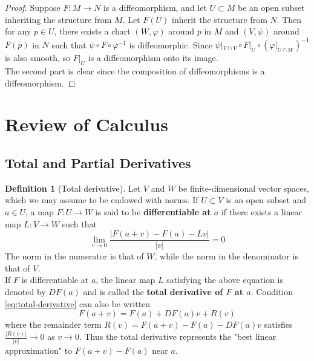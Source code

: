 \documentclass[reqno]{amsart}
\theoremstyle{plain}%
\theoremstyle{definition}
\newtheorem{definition}[theorem]{Definition}
\theoremstyle{remark}
\begin{document}
    \begin{proof}
        Suppose $F  \colon M \to N$ is a diffeomorphism, and
        let $U \subset M$ be an open subset inheriting
        the structure from $M$. Let
        $F(U)$ inherit the structure from $N$.
        Then for any $p \in U$, there exists a
        chart $\left( W, \varphi \right) $ around $p$ 
        in $M$ and $\left( V, \psi \right) $ around $F(p)$ in
        $N$ such that $\psi \circ F \circ \varphi^{-1}$ is
        diffeomorphic. Since $\psi|_{V \cap V} \circ F|_{U} \circ
        \left( \varphi|_{U \cap W} \right)^{-1} $ is also
        smooth, so  $F|_{U}$ is a diffeomorphism onto its
        image.\\
        \linebreak
        The second part is clear since the composition
        of diffeomorphisms is a diffeomorphism.
    \end{proof}


    



\newpage
\appendix
\section{Review of Calculus}
    \subsection*{Total and Partial Derivatives}
        \begin{definition}[Total derivative]
        Let $V$ and $W$ be finite-dimensional vector spaces, which we may assume to
        be endowed with norms. If $U \subset V$ is an open subset and
        $a \in U$, a map $F  \colon U \to W$ is said to be \textbf{differentiable
        at $a$} if there exists a linear map $L  \colon V \to W$ such that
        \begin{equation}
        \lim_{v \to 0} \frac{\left| F(a+v) - F(a) - Lv \right| }{\left| v \right|
        }=0 \label{eq:total-derivative}
        \end{equation}
        The norm in the numerator is that of $W$, while the norm in the denominator
        is that of $V$.\\
        If $F$ is differentiable at $a$, the linear map $L$ satisfying the above
        equation is denoted by $DF(a)$ and is called the \textbf{total derivative
        of $F$ at $a$}. Condition \eqref{eq:total-derivative} can also be written
        \[
        F(a+v) = F(a) + DF(a)v + R(v)
        \] 
        where the remainder term $R(v) = F(a+v) - F(a) - DF(a)v$ satisfies
        $\frac{\left| R(v) \right| }{\left| v \right| }\to 0$ as $v \to 0$. Thus
        the total derivative represents the "best linear approximation" to
        $F(a+v) - F(a)$ near $a$.
        \end{definition}
\end{document}
